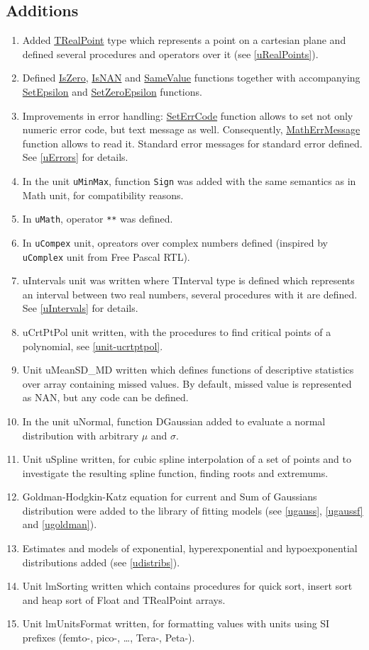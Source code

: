 \documentclass[12pt,a4paper,oneside]{report}
\newcommand{\code}[1]{\texttt{#1}}
\begin{document}
\subsection*{Additions}
\begin{enumerate}
\item Added \hyperref[types:trealpoint]{TRealPoint} type which represents a point on a cartesian plane and defined several procedures and operators over it (see \ref{uRealPoints}).
\item Defined \hyperref[utypes-IsZero]{IsZero}, \hyperref[utypes-IsNan]{IsNAN} and \hyperref[utypes-SameValue]{SameValue} functions together with accompanying \hyperref[utypes-SetEpsilon]{SetEpsilon} and \hyperref[utypes-SetZeroEpsilon]{SetZeroEpsilon} functions.
\item Improvements in error handling: \hyperref[uErrors-SetErrCode]{SetErrCode} function allows to set not only numeric error code, but text message as well. Consequently, \hyperref[uErrors-MathErrMessage]{MathErrMessage} function allows to read it.  Standard error messages for standard error defined. See \ref{uErrors} for details.
\item In the unit \code{uMinMax}, function \code{Sign} was added with the same semantics as in Math unit, for compatibility reasons.
\item In \code{uMath}, operator \code{**} was defined.
\item In \code{uCompex} unit, opreators over complex numbers defined (inspired by \\ \code{uComplex} unit from Free Pascal RTL).
\item uIntervals unit was written where TInterval type is defined which represents an interval between two real numbers, several procedures with it are defined. See \ref{uIntervals} for details.
\item uCrtPtPol unit written, with the procedures to find critical points of a polynomial, see \ref{unit-ucrtptpol}.
\item Unit uMeanSD{\_}MD written which defines functions of descriptive statistics over array containing missed values. By default, missed value is represented as NAN, but any code can be defined.
\item In the unit uNormal, function DGaussian added to evaluate a normal distribution with arbitrary $\mu$ and $\sigma$.
\item Unit uSpline written, for cubic spline interpolation of a set of points and to investigate the resulting spline function, finding roots and extremums.
\item Goldman-Hodgkin-Katz equation for current and Sum of Gaussians distribution were added to the library of fitting models (see \ref{ugauss}, \ref{ugaussf} and \ref{ugoldman}).
\item Estimates and models of exponential, hyperexponential and hypoexponential distributions added (see \ref{udistribs}).
\item Unit lmSorting written which contains procedures for quick sort, insert sort and heap sort of Float and TRealPoint arrays.
\item Unit lmUnitsFormat written, for formatting values with units using SI prefixes (femto-, pico-, \dots, Tera-, Peta-).
\end{enumerate}
\end{document}
